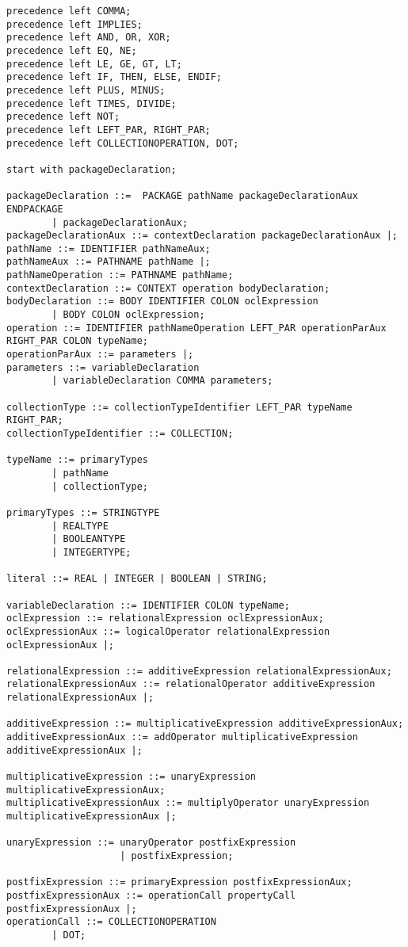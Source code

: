 \begin{lstlisting}[frame=single, caption={AnaliseLexica.flex}]
precedence left COMMA;
precedence left IMPLIES;
precedence left AND, OR, XOR;
precedence left EQ, NE;
precedence left LE, GE, GT, LT; 
precedence left IF, THEN, ELSE, ENDIF;
precedence left PLUS, MINUS;
precedence left TIMES, DIVIDE;
precedence left NOT;
precedence left LEFT_PAR, RIGHT_PAR;
precedence left COLLECTIONOPERATION, DOT; 

start with packageDeclaration;

packageDeclaration ::=  PACKAGE pathName packageDeclarationAux ENDPACKAGE
		| packageDeclarationAux;
packageDeclarationAux ::= contextDeclaration packageDeclarationAux |;
pathName ::= IDENTIFIER pathNameAux;
pathNameAux ::= PATHNAME pathName |;
pathNameOperation ::= PATHNAME pathName;
contextDeclaration ::= CONTEXT operation bodyDeclaration;
bodyDeclaration ::= BODY IDENTIFIER COLON oclExpression
		| BODY COLON oclExpression;
operation ::= IDENTIFIER pathNameOperation LEFT_PAR operationParAux RIGHT_PAR COLON typeName;
operationParAux ::= parameters |;
parameters ::= variableDeclaration
		| variableDeclaration COMMA parameters;

collectionType ::= collectionTypeIdentifier LEFT_PAR typeName RIGHT_PAR;
collectionTypeIdentifier ::= COLLECTION;
			 
typeName ::= primaryTypes 
		| pathName
		| collectionType;

primaryTypes ::= STRINGTYPE
		| REALTYPE
		| BOOLEANTYPE
		| INTEGERTYPE;
			
literal ::= REAL | INTEGER | BOOLEAN | STRING;
			
variableDeclaration ::= IDENTIFIER COLON typeName;
oclExpression ::= relationalExpression oclExpressionAux;
oclExpressionAux ::= logicalOperator relationalExpression oclExpressionAux |;

relationalExpression ::= additiveExpression relationalExpressionAux;
relationalExpressionAux ::= relationalOperator additiveExpression relationalExpressionAux |;

additiveExpression ::= multiplicativeExpression additiveExpressionAux;
additiveExpressionAux ::= addOperator multiplicativeExpression additiveExpressionAux |;

multiplicativeExpression ::= unaryExpression multiplicativeExpressionAux;
multiplicativeExpressionAux ::= multiplyOperator unaryExpression multiplicativeExpressionAux |;

unaryExpression ::= unaryOperator postfixExpression
					| postfixExpression;

postfixExpression ::= primaryExpression postfixExpressionAux;
postfixExpressionAux ::= operationCall propertyCall postfixExpressionAux |;
operationCall ::= COLLECTIONOPERATION 
		| DOT;
				  

\end{lstlisting}
